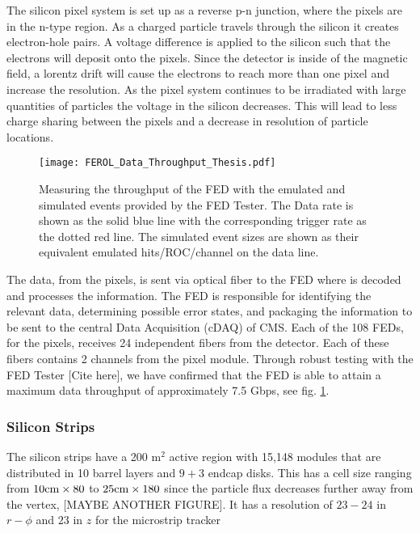 The silicon pixel system is set up as a reverse p-n junction, where the pixels are in the n-type region. As a charged particle travels through the silicon it creates electron-hole pairs. A voltage difference is applied to the silicon such that the electrons will deposit onto the pixels. Since the detector is inside of the magnetic field, a lorentz drift will cause the electrons to reach more than one pixel and increase the resolution. As the pixel system continues to be irradiated with large quantities of particles the voltage in the silicon decreases. This will lead to less charge sharing between the pixels and a decrease in resolution of particle locations. 

\begin{figure}
 	\centering
	\texttt{[image: FEROL\_Data\_Throughput\_Thesis.pdf]}
 	\caption{Measuring the throughput of the FED with the emulated and simulated events provided by the FED Tester. The Data rate is shown as the solid blue line with the corresponding trigger rate as the dotted red line. The simulated event sizes are shown as their equivalent emulated hits/ROC/channel on the data line.}
 	\label{FEDThroughput} 
\end{figure}

The data, from the pixels, is sent via optical fiber to the FED where is decoded and processes the information. The FED is responsible for identifying the relevant data, determining possible error states, and packaging the information to be sent to the central Data Acquisition (cDAQ) of CMS. Each of the 108 FEDs, for the pixels, receives 24 independent fibers from the detector. Each of these fibers contains 2 channels from the pixel module. Through robust testing with the FED Tester [Cite here], we have confirmed that the FED is able to attain a maximum data throughput of approximately 7.5 Gbps, see fig. \ref{FEDThroughput}. 

\subsubsection{Silicon Strips}
\label{subsec:Strips}

The silicon strips have a 200 m$^2$ active region with 15,148 modules that are distributed in 10 barrel layers and $9+3$ endcap disks.
This has a cell size ranging from $10 \text{cm} \times80$ \mum{} to $25 \text{cm} \times 180$ \mum{} since the particle flux decreases further away from the vertex, [MAYBE ANOTHER FIGURE]. It has a resolution of $23-24$ \mum{} in $r-\phi$ and $23$ \mum{} in $z$ for the microstrip tracker

